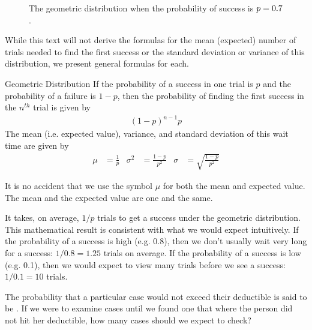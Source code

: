 \begin{figure}[h]
  \centering
  \caption{The geometric distribution when the probability
      of success is $p = 0.7{}$.}
  \label{geometricDist70}
\end{figure}

While this text will not derive the formulas for the mean (expected) number of trials needed to find the first success or the standard deviation or variance of this distribution, we present general formulas for each.

\begin{onebox}{Geometric Distribution}
  If the probability of a success in one trial is $p$
  and the probability of a failure is $1-p$, then the
  probability of finding the first success in the
  $n^{th}$ trial is given by\vspace{-1.5mm}
  \begin{align*}
  (1-p)^{n-1}p
  \end{align*}
  The mean (i.e. expected value), variance,
  and standard deviation of this wait time are given by
  \begin{align*}
  \mu &= \frac{1}{p}
      &\sigma^2 &=\frac{1-p}{p^2}
      &\sigma &= \sqrt{\frac{1-p}{p^2}}
  \end{align*}
\end{onebox}

It is no accident that we use the symbol $\mu$ for both the mean and expected value. The mean and the expected value are one and the same.

It takes, on average, $1/p$ trials to get a success under the geometric distribution. This mathematical result is consistent with what we would expect intuitively. If the probability of a success is high (e.g. 0.8), then we don't usually wait very long for a success: $1/0.8 = 1.25$ trials on average. If the probability of a success is low (e.g. 0.1), then we would expect to view many trials before we see a success: $1/0.1 = 10$ trials.

\begin{exercisewrap}
\begin{nexercise}
The probability that a particular case would not exceed their
deductible is said to be \insureSprob{}.
If we were to examine cases until we found one that where
the person did not hit her deductible, how many cases should
we expect to check?\footnotemark{}
\end{nexercise}
\end{exercisewrap}

